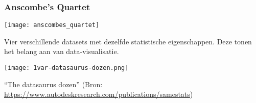 \documentclass[aspectratio=169]{beamer}
\begin{document}
\begin{frame}
  \frametitle{Anscombe's Quartet}

  \centering
  \texttt{[image: anscombes\_quartet]}

  Vier verschillende datasets met dezelfde statistische eigenschappen. Deze tonen het belang aan van data-visualisatie.
\end{frame}

\begin{frame}[plain]
  \centering

  \texttt{[image: 1var-datasaurus-dozen.png]}

  ``The datasaurus dozen'' (Bron: \url{https://www.autodeskresearch.com/publications/samestats})
\end{frame}
\end{document}
